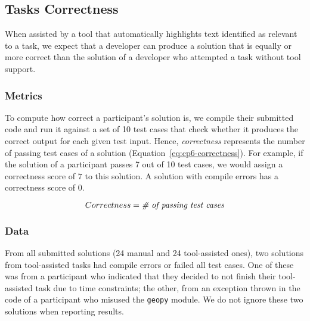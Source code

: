 
\subsection{Tasks Correctness}
\label{cp6:correctness}



When assisted by a tool that automatically highlights text identified as relevant to a task, we expect that a developer can produce a solution 
that is equally or more correct than the solution of a developer who attempted a task without tool support. 


\subsubsection{Metrics}

To compute how correct a participant's solution is, 
we compile their submitted code and run it against a set of 10 test cases that check whether it produces the correct output for each given test input. 
Hence, \textit{correctness} represents the number of passing test cases of a solution (Equation~\ref{eq:cp6-correctness}).
For example, if the solution of a participant passes 7 out of 10 test cases, we would assign a 
correctness score of $7$ to this solution. 
A solution with compile errors has a correctness score of $0$.


\begin{small}
\begin{equation}
    Correctness = \text{\textit{\# of passing test cases}}
    \label{eq:cp6-correctness}
\end{equation}
\end{small}



% 
\subsubsection{Data}

From all submitted solutions (24 manual and 24 tool-assisted ones), two 
solutions from tool-assisted tasks had compile errors or failed all test cases. 
One of these
was from a participant who indicated that they decided to not finish their tool-assisted task due to time constraints; 
the other, from an exception thrown in the code of a participant who misused the \texttt{geopy} module. We do not ignore these two solutions when reporting results.




